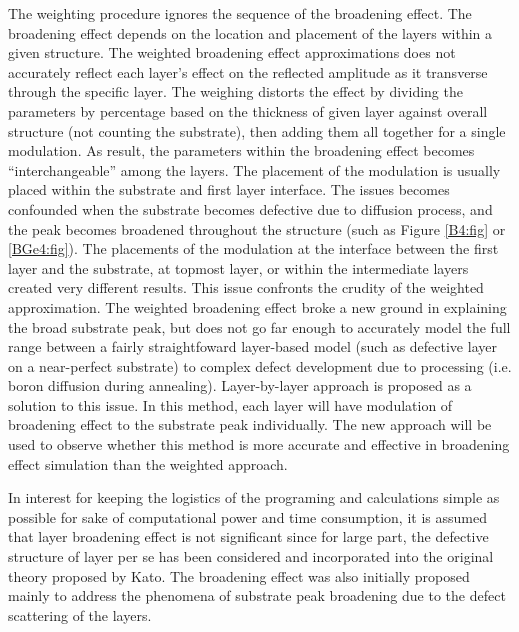 The weighting procedure ignores the sequence of the broadening effect.   The broadening effect depends on the location and placement of the layers within a given structure.  The weighted broadening effect approximations does not accurately reflect each layer's effect on the reflected amplitude as it transverse through the specific layer.  The weighing distorts the effect by dividing the parameters by percentage based on the thickness of given layer against overall structure (not counting the substrate), then adding them all together for a single modulation.  As result, the parameters within the broadening effect becomes ``interchangeable'' among the layers.  The placement of the modulation is usually placed within the substrate and first layer interface.  The issues becomes confounded when the substrate becomes defective due to diffusion process, and the peak becomes broadened throughout the structure  (such as Figure \ref{B4:fig} or \ref{BGe4:fig}).  The placements of the modulation at the interface between the first layer and the substrate, at topmost layer, or within the intermediate layers created very different results.  This issue confronts the crudity of the weighted approximation.  The weighted broadening effect broke a new ground in explaining the broad substrate peak, but does not go far enough to accurately model the full range between a fairly straightfoward layer-based model (such as defective layer on a near-perfect substrate) to complex defect development due to processing (i.e. boron diffusion during annealing).   Layer-by-layer approach is proposed as a solution to this issue.  In this method, each layer will have modulation of broadening effect to the substrate peak individually.  The new approach will be used  to observe whether this method is more accurate and effective in broadening effect simulation than the weighted approach.

In interest for keeping the logistics of the programing and calculations simple as possible for sake of computational power and time consumption, it is assumed that layer broadening effect is not significant since for large part, the defective structure of layer per se has been considered and incorporated into the original theory proposed by Kato.  The broadening effect was also initially proposed mainly to address the phenomena of substrate peak broadening due to the defect scattering of the layers.  

